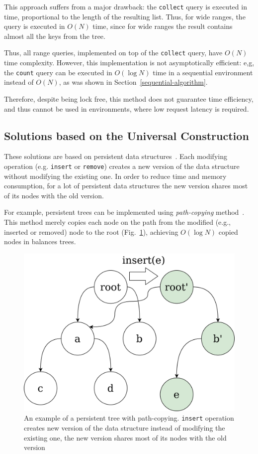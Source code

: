 \documentclass[times, dvipsnames,%
               languages={russian,english} %
              ]{itmo-student-thesis}
\begin{document}
This approach suffers from a major drawback: the \texttt{collect} query is executed in time, proportional to the length of the resulting list. Thus, for wide ranges, the query is executed in $O(N)$ time, since for wide ranges the result contains almost all the keys from the tree.

Thus, all range queries, implemented on top of the \texttt{collect} query, have $O(N)$ time complexity. However, this implementation is not asymptotically efficient: e,g, the \texttt{count} query can be executed in $O(\log N)$ time in a sequential environment instead of $O(N)$, as was shown in Section~\ref{sequential-algorithm}.

Therefore, despite being lock free, this method does not guarantee time efficiency, and thus cannot be used in environments, where low request latency is required.

\subsection{Solutions based on the Universal Construction}
\label{universal-constrcution-section}

These solutions are based on persistent data structures~\cite{persistent-data-structures}. Each modifying operation (e.g. \texttt{insert} or \texttt{remove}) creates a new version of the data structure without modifying the existing one. In order to reduce time and memory consumption, for a lot of persistent data structures the new version shares most of its nodes with the old version. 

For example, persistent trees can be implemented using \emph{path-copying} method~\cite{driscoll1989making}. This method merely copies each node on the path from the modified (e.g., inserted or removed) node to the root (Fig.~\ref{persistent-pic}), achieving $O(\log N)$ copied nodes in balances trees. 

\begin{figure}[H]
  \centering
  \caption{An example of a persistent tree with path-copying. \texttt{insert} operation creates new version of the data structure instead of modifying the existing one, the new version shares most of its nodes with the old version}
  \label{persistent-pic}
  \includegraphics[width=0.7\linewidth]{pics/persistent-set.png}
\end{figure}
\end{document}
